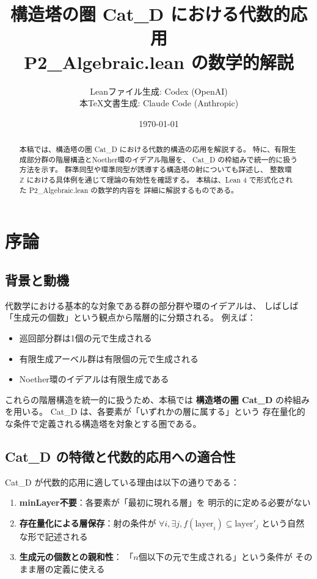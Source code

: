 \documentclass[a4paper,12pt]{ltjsarticle}
\title{構造塔の圏 Cat\_D における代数的応用\\
{\large P2\_Algebraic.lean の数学的解説}}
\author{Leanファイル生成: Codex (OpenAI)\\
本TeX文書生成: Claude Code (Anthropic)}
\date{\today}
\theoremstyle{definition}
\begin{document}
\maketitle

\begin{abstract}
本稿では、構造塔の圏 Cat\_D における代数的構造の応用を解説する。
特に、有限生成部分群の階層構造とNoether環のイデアル階層を、
Cat\_D の枠組みで統一的に扱う方法を示す。
群準同型や環準同型が誘導する構造塔の射についても詳述し、
整数環 $\mathbb{Z}$ における具体例を通じて理論の有効性を確認する。
本稿は、Lean 4 で形式化された P2\_Algebraic.lean の数学的内容を
詳細に解説するものである。
\end{abstract}

\tableofcontents

\section{序論}

\subsection{背景と動機}

代数学における基本的な対象である群の部分群や環のイデアルは、
しばしば「生成元の個数」という観点から階層的に分類される。
例えば：
\begin{itemize}
  \item 巡回部分群は1個の元で生成される
  \item 有限生成アーベル群は有限個の元で生成される
  \item Noether環のイデアルは有限生成である
\end{itemize}

これらの階層構造を統一的に扱うため、本稿では
\textbf{構造塔の圏 Cat\_D} の枠組みを用いる。
Cat\_D は、各要素が「いずれかの層に属する」という
存在量化的な条件で定義される構造塔を対象とする圏である。

\subsection{Cat\_D の特徴と代数的応用への適合性}

Cat\_D が代数的応用に適している理由は以下の通りである：

\begin{keypoint}
\begin{enumerate}
  \item \textbf{minLayer不要}：各要素が「最初に現れる層」を
    明示的に定める必要がない
  \item \textbf{存在量化による層保存}：射の条件が
    $\forall i, \exists j, f(\text{layer}_i) \subseteq \text{layer}'_j$
    という自然な形で記述される
  \item \textbf{生成元の個数との親和性}：
    「$n$個以下の元で生成される」という条件が
    そのまま層の定義に使える
\end{enumerate}
\end{keypoint}
\end{document}
